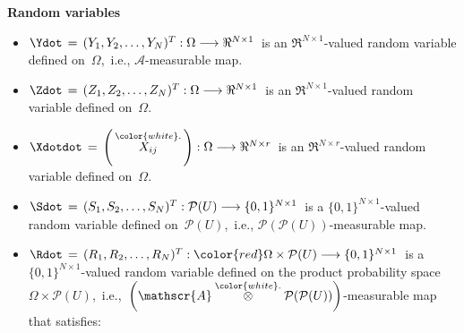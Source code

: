 \vskip 0.2cm
\noindent
\textbf{Random variables}
\begin{itemize}
\item
    $\Ydot \,=\, (Y_{1},Y_{2},\ldots,Y_{N})^{T} : \Omega \longrightarrow \Re^{N \times 1}$\,
    is an $\Re^{N \times 1}$-valued random variable defined on \,$\Omega$,\,
    i.e., $\mathscr{A}$-measurable map.
\item
    $\Zdot \,=\, (Z_{1},Z_{2},\ldots,Z_{N})^{T} : \Omega \longrightarrow \Re^{N \times 1}$\,
    is an $\Re^{N \times 1}$-valued random variable defined on \,$\Omega$.\,
\item
    $\Xdotdot\,=\,\left(\,\overset{{\color{white}.}}{X_{ij}}\,\right) : \Omega \longrightarrow \Re^{N \times r}$\,
    is an $\Re^{N \times r}$-valued random variable defined on \,$\Omega$.
\item
    $\Sdot \,=\, (S_{1},S_{2},\ldots,S_{N})^{T} : \mathcal{P}(U) \longrightarrow \{0,1\}^{N \times 1}$\,
    is a $\{0,1\}^{N \times 1}$-valued random variable defined on \,$\mathcal{P}(U)$,\,
    i.e., $\mathcal{P}(\mathcal{P}(U))$-measurable map.
\item
    $\Rdot \,=\, (R_{1},R_{2},\ldots,R_{N})^{T} : {\color{red}\Omega \times \mathcal{P}(U)} \longrightarrow \{0,1\}^{N \times 1}$\,
    is a $\{0,1\}^{N \times 1}$-valued random variable defined on the product probability space
    \,$\Omega \times \mathcal{P}(U)$,\,
    i.e.,
    \,$\left(\mathscr{A} \overset{{\color{white}.}}{\otimes} \mathcal{P}(\mathcal{P}(U))\right)$-measurable map
    that satisfies:

\end{itemize}
